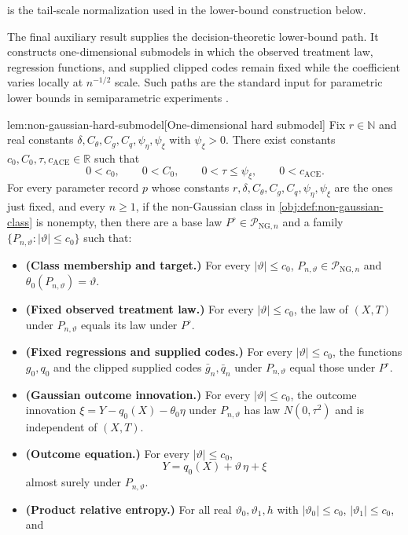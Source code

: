 \documentclass[11pt]{article}
\begin{document}
 is the tail-scale normalization used in the lower-bound construction below.

The final auxiliary result supplies the decision-theoretic lower-bound path. It constructs one-dimensional submodels in which the observed treatment law, regression functions, and supplied clipped codes remain fixed while the coefficient varies locally at \(n^{-1/2}\) scale. Such paths are the standard input for parametric lower bounds in semiparametric experiments \citep{BickelKlaassenRitovWellner1993,VanDerVaart1998}.

\begin{lemmav}{lem:non-gaussian-hard-submodel}[One-dimensional hard submodel]
Fix \(r\in\mathbb N\) and real constants
\(\delta,C_{\theta},C_g,C_q,\psi_{\eta},\psi_{\xi}\) with \(\psi_{\xi}>0\). There exist constants
\(c_0,C_0,\tau,c_{\mathrm{ACE}}\in\mathbb R\) such that
\[
0<c_0,\qquad 0<C_0,\qquad 0<\tau\le \psi_{\xi},\qquad 0<c_{\mathrm{ACE}} .
\]
For every parameter record \(p\) whose constants
\(r,\delta,C_{\theta},C_g,C_q,\psi_{\eta},\psi_{\xi}\) are the ones just fixed, and every \(n\ge 1\), if the non-Gaussian class in \cref{obj:def:non-gaussian-class} is nonempty, then there are a base law \(P^{\circ}\in\mathcal P_{\mathrm{NG},n}\) and a family \(\{P_{n,\vartheta}:|\vartheta|\le c_0\}\) such that:
\begin{itemize}
\item \textbf{(Class membership and target.)} For every \(|\vartheta|\le c_0\), \(P_{n,\vartheta}\in\mathcal P_{\mathrm{NG},n}\) and \(\theta_0(P_{n,\vartheta})=\vartheta\).
\item \textbf{(Fixed observed treatment law.)} For every \(|\vartheta|\le c_0\), the law of \((X,T)\) under \(P_{n,\vartheta}\) equals its law under \(P^{\circ}\).
\item \textbf{(Fixed regressions and supplied codes.)} For every \(|\vartheta|\le c_0\), the functions \(g_0,q_0\) and the clipped supplied codes \(\bar g_n,\bar q_n\) under \(P_{n,\vartheta}\) equal those under \(P^{\circ}\).
\item \textbf{(Gaussian outcome innovation.)} For every \(|\vartheta|\le c_0\), the outcome innovation \(\xi=Y-q_0(X)-\theta_0\eta\) under \(P_{n,\vartheta}\) has law \(N(0,\tau^2)\) and is independent of \((X,T)\).
\item \textbf{(Outcome equation.)} For every \(|\vartheta|\le c_0\),
\[
Y=q_0(X)+\vartheta\,\eta+\xi
\]
almost surely under \(P_{n,\vartheta}\).
\item \textbf{(Product relative entropy.)} For all real \(\vartheta_0,\vartheta_1,h\) with \(|\vartheta_0|\le c_0\), \(|\vartheta_1|\le c_0\), and

\end{itemize}
\end{lemmav}
\end{document}
